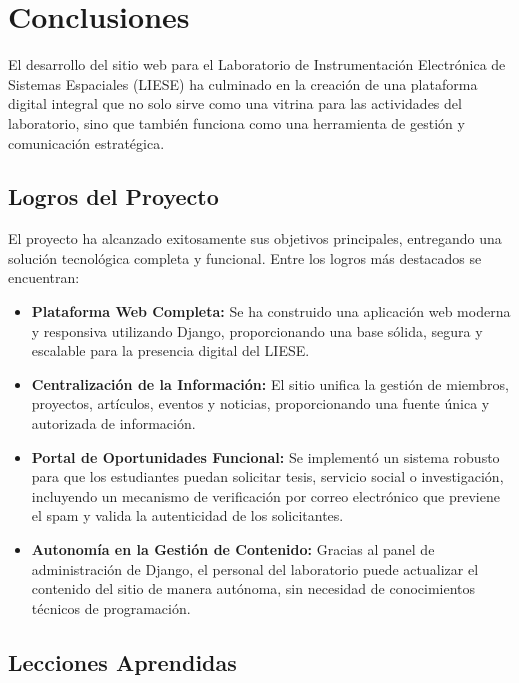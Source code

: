 \chapter{Conclusiones}
\label{chap:conclusiones}

El desarrollo del sitio web para el Laboratorio de Instrumentación Electrónica de Sistemas Espaciales (LIESE) ha culminado en la creación de una plataforma digital integral que no solo sirve como una vitrina para las actividades del laboratorio, sino que también funciona como una herramienta de gestión y comunicación estratégica.

\section{Logros del Proyecto}

El proyecto ha alcanzado exitosamente sus objetivos principales, entregando una solución tecnológica completa y funcional. Entre los logros más destacados se encuentran:
\begin{itemize}
    \item \textbf{Plataforma Web Completa:} Se ha construido una aplicación web moderna y responsiva utilizando Django, proporcionando una base sólida, segura y escalable para la presencia digital del LIESE.
    \item \textbf{Centralización de la Información:} El sitio unifica la gestión de miembros, proyectos, artículos, eventos y noticias, proporcionando una fuente única y autorizada de información.
    \item \textbf{Portal de Oportunidades Funcional:} Se implementó un sistema robusto para que los estudiantes puedan solicitar tesis, servicio social o investigación, incluyendo un mecanismo de verificación por correo electrónico que previene el spam y valida la autenticidad de los solicitantes.
    \item \textbf{Autonomía en la Gestión de Contenido:} Gracias al panel de administración de Django, el personal del laboratorio puede actualizar el contenido del sitio de manera autónoma, sin necesidad de conocimientos técnicos de programación.
\end{itemize}

\section{Lecciones Aprendidas}


